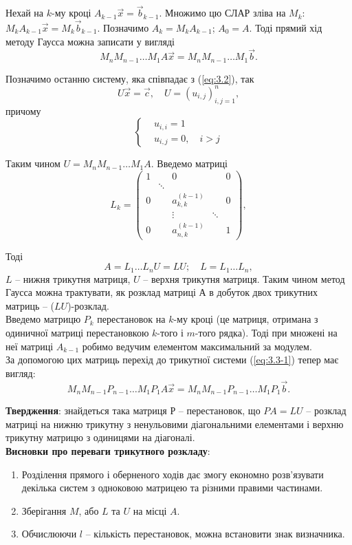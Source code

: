Нехай на $k$-му кроці $A_{k-1}\vec x = \vec b_{k-1}$. Множимо цю СЛАР зліва на $M_k$: $M_k A_{k-1}\vec x = M_k \vec b_{k-1}$. Позначимо $A_k = M_k A_{k-1}$; $A_0 = A$. Тоді прямий хід методу Гаусса можна записати у вигляді \[ M_n M_{n-1} \ldots M_1 A \vec x = M_n M_{n-1} \ldots M_1 \vec b.\]

Позначимо останню систему, яка співпадає з (\ref{eq:3.2}), так 
\begin{equation}
	\label{eq:3.5}
	U \vec x = \vec c, \quad U = (u_{i,j})_{i,j=1}^n,
\end{equation}
причому \[ \left\{ \begin{aligned} & u_{i,i} = 1 \\ & u_{i,j} = 0, \quad i > j \end{aligned} \right.\]

Таким чином $U = M_n M_{n-1} \ldots M_1 A$. Введемо матриці
\[ L_k = \begin{pmatrix} 1 & & 0 & & 0 \\ & \ddots & & & \\ 0 & & a_{k,k}^{(k-1)} & & 0 \\ & & \vdots & \ddots & \\0 & & a_{n,k}^{(k-1)} & & 1 \end{pmatrix},\]

Тоді \[A = L_1\ldots L_n U = LU; \quad  L = L_1\ldots L_n, \]
$L$ -- нижня трикутня матриця, $U$ -- верхня трикутня матриця. Таким чином метод Гаусса можна трактувати, як розклад матриці $А$ в добуток двох трикутних матриць -- ($LU$)-розклад. \\

Введемо матрицю $P_k$ перестановок на $k$-му кроці (це матриця, отримана з одиничної матриці перестановкою $k$-того і $m$-того рядка). Тоді при множені на неї матриці $A_{k-1}$ робимо ведучим елементом максимальний за модулем. \\ %

За допомогою цих матриць перехід до трикутної системи (\ref{eq:3.3-1}) тепер має вигляд: \[ M_n M_{n-1} P_{n-1} \ldots M_1 P_1 A \vec x = M_n M_{n-1} P_{n-1} \ldots M_1 P_1 \vec b. \]

\textbf{Твердження}: знайдеться така матриця $Р$ -- перестановок, що $PA = LU$ -- розклад матриці на нижню трикутну з ненульовими діагональними елементами і верхню трикутну матрицю з одиницями на діагоналі. \\

\textbf{Висновки про переваги трикутного розкладу}:
\begin{enumerate}
	\item Розділення прямого і оберненого ходів дає змогу економно розв'язувати декілька систем з одноковою матрицею та різними правими частинами.
	\item Зберігання $M$, або $L$ та $U$ на місці $A$.
	\item Обчислюючи $l$ -- кількість перестановок, можна встановити знак визначника.
\end{enumerate}

